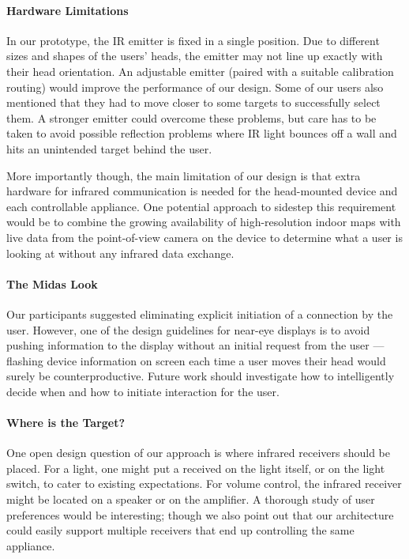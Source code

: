 \documentclass{sigchi}
\begin{document}
\paragraph{Hardware Limitations}
In our prototype, the IR emitter is fixed in a single position. Due to different sizes and shapes of the users’ heads, the emitter may not line up exactly with their head orientation. An adjustable emitter (paired with a suitable calibration routing) would improve the performance of our design. Some of our users also mentioned that they had to move closer to some targets to successfully select them. A stronger emitter could overcome these problems, but care has to be taken to avoid possible reflection problems where IR light bounces off a wall and hits an unintended target behind the user.

More importantly though, the main limitation of our design is that extra hardware for infrared communication is needed for the head-mounted device and each controllable appliance. One potential approach to sidestep this requirement would be to combine the growing availability of high-resolution indoor maps with live data from the point-of-view camera on the device to determine what a user is looking at without any infrared data exchange.

\paragraph{The Midas Look}
Our participants suggested eliminating explicit initiation of a connection by the user. However, one of the design guidelines for near-eye displays is to avoid pushing information to the display without an initial request from the user --- flashing device information on screen each time a user moves their head would surely be counterproductive. Future work should investigate how to intelligently decide when and how to initiate interaction for the user.

\paragraph{Where is the Target?}
One open design question of our approach is where infrared receivers should be placed. For a light, one might put a received on the light itself, or on the light switch, to cater to existing expectations. For volume control, the infrared receiver might be located on a speaker or on the amplifier. A thorough study of user preferences would be interesting; though we also point out that our architecture could easily support multiple receivers that end up controlling the same appliance.
\end{document}
